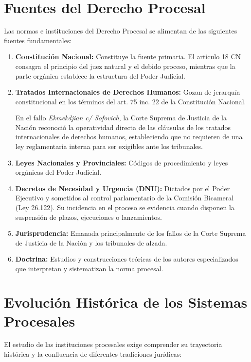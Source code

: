 \documentclass[12pt,oneside]{book}
\begin{document}
\section{Fuentes del Derecho Procesal}
Las normas e instituciones del Derecho Procesal se alimentan de las siguientes fuentes fundamentales:

\begin{enumerate}
    \item \textbf{Constitución Nacional:} Constituye la fuente primaria. El artículo 18 CN consagra el principio del juez natural y el debido proceso, mientras que la parte orgánica establece la estructura del Poder Judicial.
    \item \textbf{Tratados Internacionales de Derechos Humanos:} Gozan de jerarquía constitucional en los términos del art. 75 inc. 22 de la Constitución Nacional.
    \begin{important}
    En el fallo \textit{Ekmekdjian c/ Sofovich}, la Corte Suprema de Justicia de la Nación reconoció la operatividad directa de las cláusulas de los tratados internacionales de derechos humanos, estableciendo que no requieren de una ley reglamentaria interna para ser exigibles ante los tribunales.
    \end{important}
    \item \textbf{Leyes Nacionales y Provinciales:} Códigos de procedimiento y leyes orgánicas del Poder Judicial.
    \item \textbf{Decretos de Necesidad y Urgencia (DNU):} Dictados por el Poder Ejecutivo y sometidos al control parlamentario de la Comisión Bicameral (Ley 26.122). Su incidencia en el proceso se evidencia cuando disponen la suspensión de plazos, ejecuciones o lanzamientos.
    \item \textbf{Jurisprudencia:} Emanada principalmente de los fallos de la Corte Suprema de Justicia de la Nación y los tribunales de alzada.
    \item \textbf{Doctrina:} Estudios y construcciones teóricas de los autores especializados que interpretan y sistematizan la norma procesal.
\end{enumerate}

\section{Evolución Histórica de los Sistemas Procesales}
El estudio de las instituciones procesales exige comprender su trayectoria histórica y la confluencia de diferentes tradiciones jurídicas:
\end{document}
